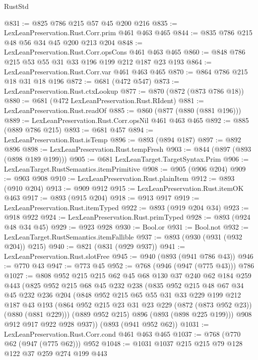 \begin{lexlean}{RustStd}
\begin{coremodule}
@831 := @825 @786 @215 @57 @45 @200 @216
@835 := LexLeanPreservation.Rust.Corr.prim @461 @463 @465
@844 := @835 @786 @215 @48 @56 @34 @45 @200 @213 @204
@848 := LexLeanPreservation.Rust.Corr.opsCons @461 @463 @465
@860 := @848 @786 @215 @53 @55 @31 @33 @196 @199 @212 @187 @23 @193
@864 := LexLeanPreservation.Rust.Corr.var @461 @463 @465
@870 := @864 @786 @215 @18 @31 @18 @196
@872 := @681 (@472 @547)
@873 := LexLeanPreservation.Rust.ctxLookup
@877 := @870 (@872 (@873 @786 @18))
@880 := @681 (@472 LexLeanPreservation.Rust.RIdent)
@881 := LexLeanPreservation.Rust.readOf
@885 := @860 (@877 (@880 (@881 @196)))
@889 := LexLeanPreservation.Rust.Corr.opsNil @461 @463 @465
@892 := @885 (@889 @786 @215)
@893 := @681 @457
@894 := LexLeanPreservation.Rust.isTemp
@896 := @893 (@894 @187)
@897 := @892 @896
@898 := LexLeanPreservation.Rust.tempFresh
@903 := @844 (@897 (@893 (@898 @189 @199)))
@905 := @681 LexLeanTarget.TargetSyntax.Prim
@906 := LexLeanTarget.RustSemantics.itemPrimitive
@908 := @905 (@906 @204)
@909 := @903 @908
@910 := LexLeanPreservation.Rust.plainItem
@912 := @893 (@910 @204)
@913 := @909 @912
@915 := LexLeanPreservation.Rust.itemOK @463
@917 := @893 (@915 @204)
@918 := @913 @917
@919 := LexLeanPreservation.Rust.itemTyped
@922 := @893 (@919 @204 @34)
@923 := @918 @922
@924 := LexLeanPreservation.Rust.primTyped
@928 := @893 (@924 @48 @34 @45)
@929 := @923 @928
@930 := Bool.or
@931 := Bool.not
@932 := LexLeanTarget.RustSemantics.itemFallible
@937 := @893 (@930 (@931 (@932 @204)) @215)
@940 := @821 (@831 (@929 @937))
@941 := LexLeanPreservation.Rust.slotFree
@945 := @940 (@893 (@941 @786 @43))
@946 := @770 @43
@947 := @773 @45
@952 := @768 (@946 (@947 (@775 @43))) @786
@1027 := @808
    @952
    @215
    @215
    @62
    @45
    @68
    @130
    @37
    @240
    @62
    @184
    @259
    @443
    (@825
      @952
      @215
      @68
      @45
      @232
      @238
      (@835
        @952
        @215
        @48
        @67
        @34
        @45
        @232
        @236
        @204
        (@848
          @952
          @215
          @65
          @55
          @31
          @33
          @229
          @199
          @212
          @187
          @43
          @193
          (@864 @952 @215 @23 @31 @23 @229 (@872 (@873 @952 @23)) (@880 (@881 @229)))
          (@889 @952 @215)
          @896
          (@893 (@898 @225 @199)))
        @908
        @912
        @917
        @922
        @928
        @937))
    (@893 (@941 @952 @62))
@1031 := LexLeanPreservation.Rust.Corr.cond @461 @463 @465
@1037 := @768 (@770 @62 (@947 (@775 @62))) @952
@1048 := @1031 @1037 @215 @215 @79 @128 @122 @37 @259 @274 @199 @443

\end{coremodule}
\end{lexlean}
